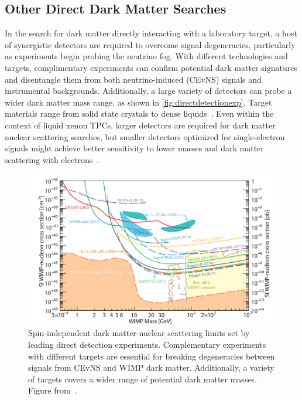 \subsection{Other Direct Dark Matter Searches}

In the search for dark matter directly interacting with a laboratory target, a host of synergistic detectors are required to overcome signal degeneracies, particularly as experiments begin probing the neutrino fog. With different technologies and targets, complimentary experiments can confirm potential dark matter signatures and disentangle them from both neutrino-induced (CEvNS) signals and instrumental backgrounds. Additionally, a large variety of detectors can probe a wider dark matter mass range, as shown in \autoref{fig:directdetectionexp}. Target materials range from solid state crystals to dense liquids~\cite{Undagoitia:2015gya, Tanabashi:2018oca}. Even within the context of liquid xenon TPCs, larger detectors are required for dark matter nuclear scattering searches, but smaller detectors optimized for single-electron signals might achieve better sensitivity to lower masses and dark matter scattering with electrons~\cite{Bernstein:2020cpc}. 

\begin{figure}[!htbp]
\centering
\includegraphics[scale=.24]{fig_directdetectionexp.png}
\caption{Spin-independent dark matter-nuclear scattering limits set by leading direct detection experiments. Complementary experiments with different targets are essential for breaking degeneracies between signals from CEvNS and WIMP dark matter. Additionally, a variety of targets covers a wider range of potential dark matter masses. Figure from~\cite{Tanabashi:2018oca}.}
\label{fig:directdetectionexp}
\end{figure}


